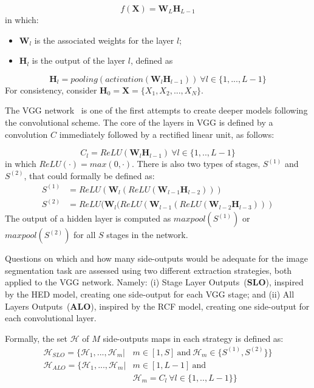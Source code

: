 \begin{equation}
\mathit{f}(\mathbf{X})=\mathbf{W}_L\mathbf{H}_{L-1}
\end{equation}
\noindent in which:
\begin{itemize}
\item $\mathbf{W}_l$ is the associated weights for the layer $l$;
\item $\mathbf{H}_l$ is the output of the layer $l$, defined as
\end{itemize}

\small
\begin{equation}
\mathbf{H}_l= pooling(activation(\mathbf{W}_l\mathbf{H}_{l-1}))~\forall l \in \{1,...,L-1\}
\end{equation}
\normalsize
\noindent For consistency, consider $\mathbf{H}_0=\mathbf{X}=\{X_1, X_2,...,X_N\}$. %

The VGG network~\cite{simonyan2014} is one of the first attempts to create deeper models following the convolutional scheme. The core of the layers in VGG is defined by a convolution $C$ immediately followed by a rectified linear unit, as follows:


\begin{equation}
C_l=ReLU(\mathbf{W}_{l}\mathbf{H}_{l-1})~\forall l \in \{1,..,L-1\}
\end{equation}
\noindent in which $ReLU(\cdot)=max(0,\cdot)$. There is also two types of stages, $\mathit{S}^{(1)}$ and $\mathit{S}^{(2)}$, that could formally be defined as:
\small
\begin{align}
\mathit{S}^{(1)}&=ReLU(\mathbf{W}_l(ReLU(\mathbf{W}_{l-1}\mathbf{H}_{l-2})))\\
\mathit{S}^{(2)}&=ReLU(\mathbf{W}_l(ReLU(\mathbf{W}_{l-1}(ReLU(\mathbf{W}_{l-2}\mathbf{H}_{l-3})))
\end{align}
\normalsize
\noindent The output of a hidden layer is computed as $maxpool(\mathit{S}^{(1)})$ or $maxpool(\mathit{S}^{(2)})$ for all $S$ stages in the network.

Questions on which and how many side-outputs would be adequate for the image segmentation task are assessed using two different extraction strategies, both applied to the VGG network. Namely: (i) Stage Layer Outputs~(\textbf{SLO}), inspired by the HED model, creating one side-output for each VGG stage; and (ii) All Layers Outputs~(\textbf{ALO}), inspired by the RCF model, creating one side-output for each convolutional layer. 


Formally, the set $\mathcal{H}$ of $M$ side-outputs maps in each strategy is defined as:
\small
\begin{align}
\mathcal{H}_{SLO}=\{\mathcal{H}_1,...,\mathcal{H}_m|& m\in[1,S]~\text{and}~\mathcal{H}_m \in\{S^{(1)},S^{(2)}\}\}\\
\mathcal{H}_{ALO}=\{\mathcal{H}_1,...,\mathcal{H}_m|& m\in[1,L-1]~\text{and}~\nonumber\\&\mathcal{H}_m=C_l~\forall l \in \{1,..,L-1\}\}
\end{align}
\normalsize

